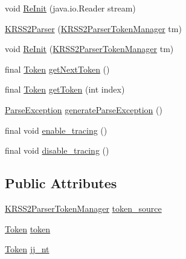\begin{DoxyCompactItemize}
\item 
void \hyperlink{classde_1_1uulm_1_1ecs_1_1ai_1_1owlapi_1_1krssparser_1_1_k_r_s_s2_parser_ad24d416d14890b2404d3b6daaeeae8b6}{Re\-Init} (java.\-io.\-Reader stream)
\item 
\hyperlink{classde_1_1uulm_1_1ecs_1_1ai_1_1owlapi_1_1krssparser_1_1_k_r_s_s2_parser_ac2474d7f1652283bd7ce410681b99142}{K\-R\-S\-S2\-Parser} (\hyperlink{classde_1_1uulm_1_1ecs_1_1ai_1_1owlapi_1_1krssparser_1_1_k_r_s_s2_parser_token_manager}{K\-R\-S\-S2\-Parser\-Token\-Manager} tm)
\item 
void \hyperlink{classde_1_1uulm_1_1ecs_1_1ai_1_1owlapi_1_1krssparser_1_1_k_r_s_s2_parser_ad22e30b1606c233398c7c7eb47281dea}{Re\-Init} (\hyperlink{classde_1_1uulm_1_1ecs_1_1ai_1_1owlapi_1_1krssparser_1_1_k_r_s_s2_parser_token_manager}{K\-R\-S\-S2\-Parser\-Token\-Manager} tm)
\item 
final \hyperlink{classde_1_1uulm_1_1ecs_1_1ai_1_1owlapi_1_1krssparser_1_1_token}{Token} \hyperlink{classde_1_1uulm_1_1ecs_1_1ai_1_1owlapi_1_1krssparser_1_1_k_r_s_s2_parser_a95d1a642d92e4dd8bd38f88bd19bec07}{get\-Next\-Token} ()
\item 
final \hyperlink{classde_1_1uulm_1_1ecs_1_1ai_1_1owlapi_1_1krssparser_1_1_token}{Token} \hyperlink{classde_1_1uulm_1_1ecs_1_1ai_1_1owlapi_1_1krssparser_1_1_k_r_s_s2_parser_a0f4271cb80a141d834b35c2462b78101}{get\-Token} (int index)
\item 
\hyperlink{classde_1_1uulm_1_1ecs_1_1ai_1_1owlapi_1_1krssparser_1_1_parse_exception}{Parse\-Exception} \hyperlink{classde_1_1uulm_1_1ecs_1_1ai_1_1owlapi_1_1krssparser_1_1_k_r_s_s2_parser_a9851f844463118aa9bd0843a5d30dbe7}{generate\-Parse\-Exception} ()
\item 
final void \hyperlink{classde_1_1uulm_1_1ecs_1_1ai_1_1owlapi_1_1krssparser_1_1_k_r_s_s2_parser_a787dc11addd5a39dc8ee2f4318a9e2b6}{enable\-\_\-tracing} ()
\item 
final void \hyperlink{classde_1_1uulm_1_1ecs_1_1ai_1_1owlapi_1_1krssparser_1_1_k_r_s_s2_parser_a800caf9996ed5db87d61b93afeda2a99}{disable\-\_\-tracing} ()
\end{DoxyCompactItemize}
\subsection*{Public Attributes}
\begin{DoxyCompactItemize}
\item 
\hyperlink{classde_1_1uulm_1_1ecs_1_1ai_1_1owlapi_1_1krssparser_1_1_k_r_s_s2_parser_token_manager}{K\-R\-S\-S2\-Parser\-Token\-Manager} \hyperlink{classde_1_1uulm_1_1ecs_1_1ai_1_1owlapi_1_1krssparser_1_1_k_r_s_s2_parser_a6a4c8007d3c885431ad88c31170d2d13}{token\-\_\-source}
\item 
\hyperlink{classde_1_1uulm_1_1ecs_1_1ai_1_1owlapi_1_1krssparser_1_1_token}{Token} \hyperlink{classde_1_1uulm_1_1ecs_1_1ai_1_1owlapi_1_1krssparser_1_1_k_r_s_s2_parser_ae423d796e4b505f7b79aff9cb8966d55}{token}
\item 
\hyperlink{classde_1_1uulm_1_1ecs_1_1ai_1_1owlapi_1_1krssparser_1_1_token}{Token} \hyperlink{classde_1_1uulm_1_1ecs_1_1ai_1_1owlapi_1_1krssparser_1_1_k_r_s_s2_parser_aaf362bca440da548457d99c816fbd618}{jj\-\_\-nt}
\end{DoxyCompactItemize}
